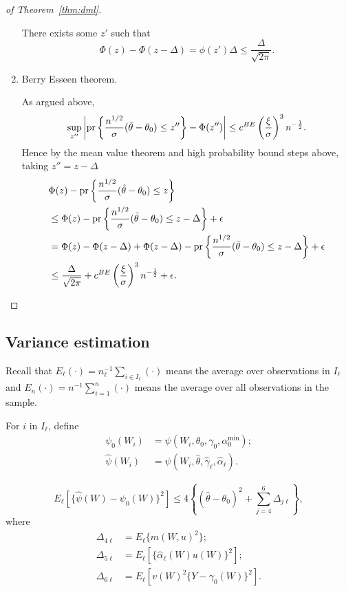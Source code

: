 \begin{proof}[of Theorem~\ref{thm:dml}]
\begin{enumerate}
    There exists some $z'$ such that
    $$
\Phi(z)-\Phi(z-\Delta)=\phi(z') \Delta \leq  \frac{\Delta}{\sqrt{2 \pi}}.
$$
    \item Berry Esseen theorem.
    
    As argued above,
$$
\sup_{z''}\left|\text{\normalfont pr}\left\{\frac{n^{1/2}}{\sigma}(\bar{\theta}-\theta_0)\leq z''\right\}-\Phi(z'')\right|\leq c^{BE} \left(\frac{\xi}{\sigma}\right)^3n^{-\frac{1}{2}}.
$$
Hence by the mean value theorem and high probability bound steps above, taking $z''=z-\Delta$
\begin{align*}
    &\Phi(z)-\text{\normalfont pr}\left\{\frac{n^{1/2}}{\sigma}(\hat{\theta}-\theta_0)\leq z\right\}\\
    &\leq \Phi(z)-\text{\normalfont pr}\left\{\frac{n^{1/2}}{\sigma}(\bar{\theta}-\theta_0)\leq z-\Delta\right\}+\epsilon \\
    &=\Phi(z)-\Phi(z-\Delta)+\Phi(z-\Delta)-\text{\normalfont pr}\left\{\frac{n^{1/2}}{\sigma}(\bar{\theta}-\theta_0)\leq z-\Delta\right\}+\epsilon \\
    &\leq \frac{\Delta}{\sqrt{2 \pi}}+c^{BE} \left(\frac{\xi}{\sigma}\right)^3n^{-\frac{1}{2}}+\epsilon.
\end{align*}
\end{enumerate}
\end{proof}



\subsection{Variance estimation}

Recall that $E_{\ell}(\cdot)=n_{\ell}^{-1}\sum_{i\in I_{\ell}}(\cdot)$ means the average over observations in $I_{\ell}$ and $E_n(\cdot)=n^{-1}\sum_{i=1}^n(\cdot)$ means the average over all observations in the sample.

\begin{definition}
For $i \text{ in }  I_{\ell}$, define
\begin{align*}
    \psi_0(W_i)&=\psi(W_i,\theta_0,\gamma_0,\alpha_0^{\min}); \\
    \hat{\psi}(W_i)&=\psi(W_i,\hat{\theta},\hat{\gamma}_{\ell},\hat{\alpha}_{\ell}).
\end{align*}
\end{definition}

\begin{proposition}\label{prop:foldwise2}
$$
E_{\ell}[\{\hat{\psi}(W)-\psi_0(W)\}^2]\leq 4\left\{(\hat{\theta}-\theta_0)^2+\sum_{j=4}^6 \Delta_{j\ell}\right\},
$$
where
\begin{align*}
    \Delta_{4\ell} &=E_{\ell}\{m(W,u)^2\} ;\\
    \Delta_{5\ell}&=E_{\ell}[\{\hat{\alpha}_{\ell}(W)u(W)\}^2]; \\
    \Delta_{6\ell}&=E_{\ell}[v(W)^2\{Y-\gamma_0(W)\}^2].
\end{align*}
\end{proposition}

